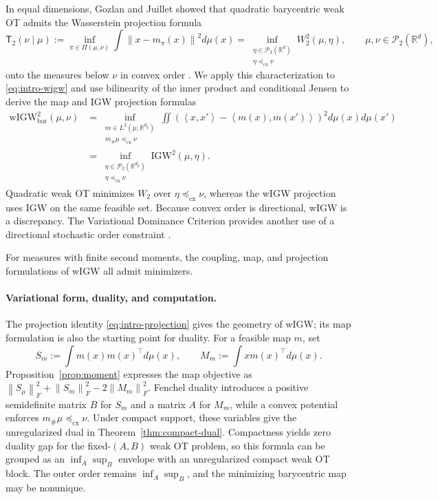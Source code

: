 \documentclass[11pt]{article}
\newcommand{\R}{\mathbb R}
\newcommand{\cP}{\mathcal P}
\newcommand{\ip}[2]{\left\langle #1,#2\right\rangle}
\newcommand{\norm}[1]{\left\lVert #1\right\rVert}
\newcommand{\cx}{\preceq_{\mathrm{cx}}}
\newcommand{\wIGW}{\mathrm{wIGW}_{\mathrm{bar}}}
\newcommand{\IGW}{\mathrm{IGW}}
\theoremstyle{plain}
\theoremstyle{definition}
\theoremstyle{remark}
\begin{document}
In equal dimensions, Gozlan and Juillet showed that quadratic barycentric weak OT
admits the Wasserstein projection formula
\begin{equation}\label{eq:intro-quadratic-wot}
 \mathsf T_2(\nu\mid\mu)
 :=\inf_{\pi\in\Pi(\mu,\nu)}
   \int\norm{x-m_\pi(x)}^2d\mu(x)
 =\inf_{\substack{\eta\in\cP_2(\R^d)\\\eta\cx\nu}}
   W_2^2(\mu,\eta),
 \qquad \mu,\nu\in\cP_2(\R^d),
\end{equation}
onto the measures below $\nu$ in convex order \cite{GozlanJuillet}. We apply this
characterization to \eqref{eq:intro-wigw} and use bilinearity of the inner product
and conditional Jensen to derive the map and IGW projection formulas
\begin{equation}\label{eq:intro-projection}
  \begin{aligned}
  \wIGW^2(\mu,\nu)
  &=\inf_{\substack{m\in L^2(\mu;\R^{d_y})\\m_\#\mu\cx\nu}}
    \iint\!\left(\ip{x}{x'}-\ip{m(x)}{m(x')}\right)^2d\mu(x)d\mu(x')\\
  &=\inf_{\substack{\eta\in\cP_2(\R^{d_y})\\\eta\cx\nu}}
    \IGW^2(\mu,\eta).
  \end{aligned}
\end{equation}
Quadratic weak OT minimizes $W_2$ over $\eta\cx\nu$, whereas the wIGW projection
uses IGW on the same feasible set. Because convex order is directional, wIGW is a
discrepancy. The
Variational Dominance Criterion provides another use of a directional stochastic
order constraint \cite{DomingoEnrichSchiffMroueh2023}.

For measures with finite second moments, the coupling, map, and projection
formulations of wIGW all admit minimizers.

\pointmartingalefigure

\iffalse
\paragraph{Variational form, duality, and computation.}
The projection identity \eqref{eq:intro-projection} gives the geometry of wIGW;
its map formulation is also the starting point for duality. For a feasible map
$m$, set
\[
 S_m:=\int m(x)m(x)^\top d\mu(x),
 \qquad M_m:=\int x m(x)^\top d\mu(x).
\]
Proposition~\ref{prop:moment} expresses the map objective as
$\norm{S_\mu}_F^2+\norm{S_m}_F^2-2\norm{M_m}_F^2$. Fenchel duality introduces a
positive semidefinite matrix $B$ for $S_m$ and a matrix $A$ for $M_m$, while a
convex potential enforces $m_\#\mu\cx\nu$. Under compact support, these variables
give the unregularized dual in Theorem~\ref{thm:compact-dual}. Compactness yields
zero duality gap for the fixed-$(A,B)$ weak OT problem, so this formula can be
grouped as an $\inf_A\sup_B$ envelope with an unregularized compact weak OT block.
The outer order remains $\inf_A\sup_B$, and the minimizing barycentric map may be
nonunique.
\end{document}
